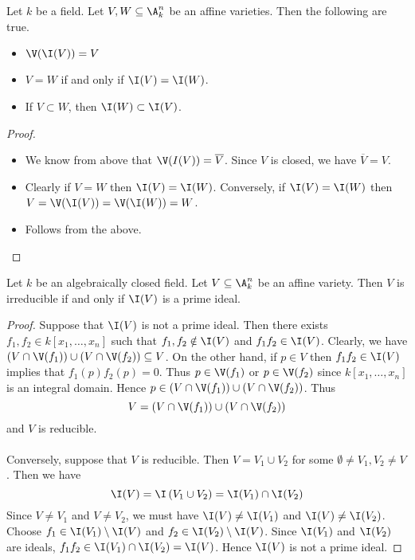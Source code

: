 \documentclass[a4paper]{article}
\begin{document}
\begin{lmm}{}{} Let $k$ be a field. Let $V,W\subseteq\A_k^n$ be an affine varieties. Then the following are true. 
\begin{itemize}
\item $\V(\I(V))=V$
\item $V=W$ if and only if $\I(V)=\I(W)$. 
\item If $V\subset W$, then $\I(W)\subset\I(V)$. 
\end{itemize} \tcbline
\begin{proof}~\\
\begin{itemize}
\item We know from above that $\V(I(V))=\overline{V}$. Since $V$ is closed, we have $\overline{V}=V$. 
\item Clearly if $V=W$ then $\I(V)=\I(W)$. Conversely, if $\I(V)=\I(W)$ then $V=\V(\I(V))=\V(\I(W))=W$. 
\item Follows from the above. 
\end{itemize}
\end{proof}
\end{lmm}

\begin{prp}{}{} Let $k$ be an algebraically closed field. Let $V\subseteq\A_k^n$ be an affine variety. Then $V$ is irreducible if and only if $\I(V)$ is a prime ideal. \tcbline
\begin{proof}
Suppose that $\I(V)$ is not a prime ideal. Then there exists $f_1,f_2\in k[x_1,\dots,x_n]$ such that $f_1,f_2\notin\I(V)$ and $f_1f_2\in\I(V)$. Clearly, we have $(V\cap\V(f_1))\cup(V\cap\V(f_2))\subseteq V$. On the other hand, if $p\in V$ then $f_1f_2\in\I(V)$ implies that $f_1(p)f_2(p)=0$. Thus $p\in\V(f_1)$ or $p\in\V(f_2)$ since $k[x_1,\dots,x_n]$ is an integral domain. Hence $p\in (V\cap\V(f_1))\cup(V\cap\V(f_2))$. Thus $$V=(V\cap\V(f_1))\cup(V\cap\V(f_2))$$ and $V$ is reducible. \\~\\

Conversely, suppose that $V$ is reducible. Then $V=V_1\cup V_2$ for some $\emptyset\neq V_1,V_2\neq V$. Then we have $$\I(V)=\I\left(V_1\cup V_2\right)=\I(V_1)\cap\I(V_2)$$ Since $V\neq V_1$ and $V\neq V_2$, we must have $\I(V)\neq\I(V_1)$ and $\I(V)\neq\I(V_2)$. Choose $f_1\in\I(V_1)\setminus\I(V)$ and $f_2\in\I(V_2)\setminus\I(V)$. Since $\I(V_1)$ and $\I(V_2)$ are ideals, $f_1f_2\in\I(V_1)\cap\I(V_2)=\I(V)$. Hence $\I(V)$ is not a prime ideal. 
\end{proof}
\end{prp}
\end{document}

